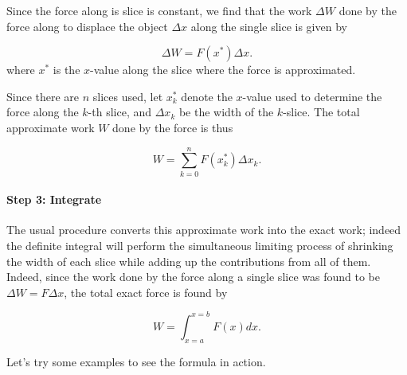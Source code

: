 \documentclass{ximera}
\begin{document}
\begin{model}
\begin{multipleChoice}
\end{multipleChoice}

Since the force along is slice is constant, we find that the work $\Delta W$ done by the force along to displace the object $\Delta x$ along the single slice is given by 

\[
\Delta W = F(x^*) \Delta x.
\]
where $x^*$ is the $x$-value along the slice where the force is approximated.

Since there are $n$ slices used, let $x^*_k$ denote the $x$-value used to determine the force along the $k$-th slice, and $\Delta x_k$ be the width of the $k$-slice.  The total approximate work $W$ done by the force is thus

\[
W = \sum_{k=0}^n F(x_k^*) \Delta x_k.
\]

\paragraph{Step 3: Integrate}  The usual procedure converts this approximate work into the exact work; indeed the definite integral will perform the simultaneous limiting process of shrinking the width of each slice while adding up the contributions from all of them.  Indeed, since the work done by the force along a single slice was found to be $\Delta W =F \Delta x$, the total exact force is found by

\[
W = \int_{x=a}^{x=b} F(x)  dx.
\]

\end{model}



Let's try some examples to see the formula in action.
\end{document}
